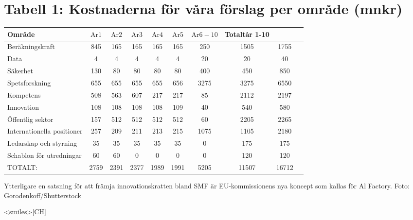 {{{\section*{Tabell 1: Kostnaderna för våra förslag per område (mnkr)}
\begin{tabular}{lccccccccc}
\hline Område & \(\mathrm{Ar} 1\) & \(\mathrm{Ar} 2\) & \(\mathrm{Ar} 3\) & \(\mathrm{Ar} 4\) & \(\mathrm{Ar} 5\) & \(\mathrm{Ar} 6-10\) & Totaltår 1-10 & \\
\hline Beräkningskraft & 845 & 165 & 165 & 165 & 165 & 250 & 1505 & 1755 \\
\hline Data & 4 & 4 & 4 & 4 & 4 & 20 & 20 & 40 \\
\hline Säkerhet & 130 & 80 & 80 & 80 & 80 & 400 & 450 & 850 \\
\hline Spetsforskning & 655 & 655 & 655 & 655 & 656 & 3275 & 3275 & 6550 \\
\hline Kompetens & 508 & 563 & 607 & 217 & 217 & 85 & 2112 & 2197 \\
\hline Innovation & 108 & 108 & 108 & 108 & 109 & 40 & 540 & 580 \\
\hline Öffentlig sektor & 157 & 512 & 512 & 512 & 512 & 60 & 2205 & 2265 \\
\hline Internationella positioner & 257 & 209 & 211 & 213 & 215 & 1075 & 1105 & 2180 \\
\hline Ledarskap och styrning & 35 & 35 & 35 & 35 & 35 & 0 & 175 & 175 \\
\hline Schablon för utredningar & 60 & 60 & 0 & 0 & 0 & 0 & 120 & 120 \\
\hline TOTALT: & 2759 & 2391 & 2377 & 1989 & 1991 & 5205 & 11507 & 16712 \\
\hline
\end{tabular}

Ytterligare en satsning för att främja innovationskratten bland SMF är EU-kommissionens nya koncept som kallas för Al Factory. Foto: Gorodenkoff/Shutterstock

<smiles>[CH]

}}}
